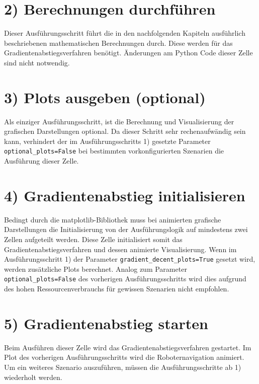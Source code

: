 \section*{2) Berechnungen durchführen}
Dieser Ausführungsschritt führt die in den nachfolgenden Kapiteln ausführlich beschriebenen mathematischen Berechnungen durch. Diese werden für das Gradientenabstiegsverfahren benötigt. Änderungen am Python Code dieser Zelle sind nicht notwendig.

\section*{3) Plots ausgeben (optional)}
Als einziger Ausführungsschritt, ist die Berechnung und Visualisierung der grafischen Darstellungen optional. Da dieser Schritt sehr rechenaufwändig sein kann, verhindert der im Ausführungsschritts 1) gesetzte Parameter \texttt{optional\_plots=False} bei bestimmten vorkonfigurierten Szenarien die Ausführung dieser Zelle.

\section*{4) Gradientenabstieg initialisieren}
Bedingt durch die matplotlib-Bibliothek muss bei animierten grafische Darstellungen die Initialisierung von der Ausführungslogik auf mindestens zwei Zellen aufgeteilt werden. Diese Zelle initialisiert somit das Gradientenabstiegsverfahren und dessen animierte Visualisierung. Wenn im Ausführungsschritt 1) der Parameter \texttt{gradient\_decent\_plots=True} gesetzt wird, werden zusätzliche Plots berechnet. Analog zum Parameter \texttt{optional\_plots=False} des vorherigen Ausführungsschritts wird dies aufgrund des hohen Ressourcenverbrauchs für gewissen Szenarien nicht empfohlen.

\section*{5) Gradientenabstieg starten}
Beim Ausführen dieser Zelle wird das Gradientenabstiegsverfahren gestartet. Im Plot des vorherigen Ausführungsschritts wird die Roboternavigation animiert.
Um ein weiteres Szenario auszuführen, müssen die Ausführungsschritte ab 1) wiederholt werden.


